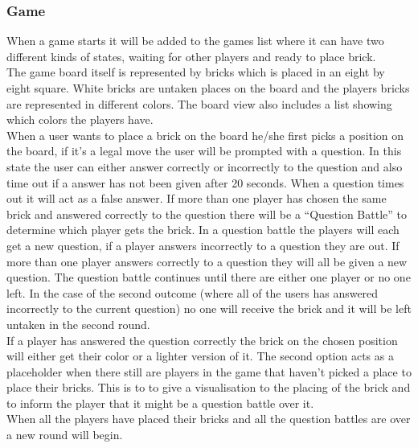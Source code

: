 \subsubsection{Game}
When a game starts it will be added to the games list where it can have two different kinds of states, waiting for other players and ready to place brick.\\
The game board itself is represented by bricks which is placed in an eight by eight square. White bricks are untaken places on the board and the players bricks are represented in different colors. The board view also includes a list showing which colors the players have.\\
When a user wants to place a brick on the board he/she first picks a position on the board, if it's a legal move the user will be prompted with a question. In this state the user can either answer correctly or incorrectly to the question and also time out if a answer has not been given after 20 seconds. When a question times out it will act as a false answer. If more than one player has chosen the same brick and answered correctly to the question there will be a ``Question Battle'' to determine which player gets the brick. In a question battle the players will each get a new question, if a player answers incorrectly to a question they are out. If more than one player answers correctly to a question they will all be given a new question. The question battle continues until there are either one player or no one left. In the case of the second outcome (where all of the users has answered incorrectly to the current question) no one will receive the brick and it will be left untaken in the second round.\\
If a player has answered the question correctly the brick on the chosen position will either get their color or a lighter version of it. The second option acts as a placeholder when there still are players in the game that haven't picked a place to place their bricks. This is to to give a visualisation to the placing of the brick and to inform the player that it might be a question battle over it.\\ 
When all the players have placed their bricks and all the question battles are over a new round will begin.
